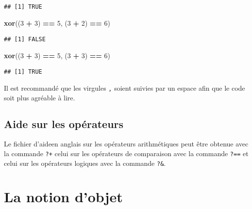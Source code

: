 \documentclass[]{book}
\makeatletter
\newenvironment{Shaded}{\begin{snugshade}}{\end{snugshade}}
\newcommand{\KeywordTok}[1]{\textcolor[rgb]{0.13,0.29,0.53}{\textbf{#1}}}
\newcommand{\DecValTok}[1]{\textcolor[rgb]{0.00,0.00,0.81}{#1}}
\newcommand{\StringTok}[1]{\textcolor[rgb]{0.31,0.60,0.02}{#1}}
\newcommand{\OperatorTok}[1]{\textcolor[rgb]{0.81,0.36,0.00}{\textbf{#1}}}
\newcommand{\NormalTok}[1]{#1}
\newenvironment{kframe}{%
\medskip{}
\setlength{\fboxsep}{.8em}
 \def\at@end@of@kframe{}%
 \ifinner\ifhmode%
  \def\at@end@of@kframe{\end{minipage}}%
  \begin{minipage}{\columnwidth}%
 \fi\fi%
 \def\FrameCommand##1{\hskip\@totalleftmargin \hskip-\fboxsep
 \colorbox{shadecolor}{##1}\hskip-\fboxsep
     \hskip-\linewidth \hskip-\@totalleftmargin \hskip\columnwidth}%
 \MakeFramed {\advance\hsize-\width
   \@totalleftmargin\z@ \linewidth\hsize
   \@setminipage}}%
 {\par\unskip\endMakeFramed%
 \at@end@of@kframe}
\newenvironment{rmdblock}[1]
  {
  \begin{itemize}
  \renewcommand{\labelitemi}{
    \raisebox{-.7\height}[0pt][0pt]{
      {\setkeys{Gin}{width=3em,keepaspectratio}\texttt{[image: myIcons/\#1]}} %
    }
  }
  \setlength{\fboxsep}{1em}
  \begin{kframe}
  \item
  }
  {
  \end{kframe}
  \end{itemize}
  }
\newenvironment{rmdstyle}     %
  {\begin{rmdblock}{style}}   %
  {\end{rmdblock}}            %
\makeatother
\begin{document}
\begin{verbatim}
## [1] TRUE
\end{verbatim}

\begin{Shaded}
\begin{Highlighting}[]
\KeywordTok{xor}\NormalTok{((}\DecValTok{3} \OperatorTok{+}\StringTok{ }\DecValTok{3}\NormalTok{) }\OperatorTok{==}\StringTok{ }\DecValTok{5}\NormalTok{, (}\DecValTok{3} \OperatorTok{+}\StringTok{ }\DecValTok{2}\NormalTok{) }\OperatorTok{==}\StringTok{ }\DecValTok{6}\NormalTok{)}
\end{Highlighting}
\end{Shaded}

\begin{verbatim}
## [1] FALSE
\end{verbatim}

\begin{Shaded}
\begin{Highlighting}[]
\KeywordTok{xor}\NormalTok{((}\DecValTok{3} \OperatorTok{+}\StringTok{ }\DecValTok{3}\NormalTok{) }\OperatorTok{==}\StringTok{ }\DecValTok{5}\NormalTok{, (}\DecValTok{3} \OperatorTok{+}\StringTok{ }\DecValTok{3}\NormalTok{) }\OperatorTok{==}\StringTok{ }\DecValTok{6}\NormalTok{)}
\end{Highlighting}
\end{Shaded}

\begin{verbatim}
## [1] TRUE
\end{verbatim}

\begin{rmdstyle}
Il est recommandé que les virgules \texttt{,} soient suivies par un
espace afin que le code soit plus agréable à lire.
\end{rmdstyle}

\subsection{Aide sur les opérateurs}\label{aide-sur-les-operateurs}

Le fichier d'aideen anglais sur les opérateurs arithmétiques peut être
obtenue avec la commande \texttt{?\textquotesingle{}+\textquotesingle{}}
celui sur les opérateurs de comparaison avec la commande
\texttt{?\textquotesingle{}==\textquotesingle{}} et celui sur les
opérateurs logiques avec la commande
\texttt{?\textquotesingle{}\&\textquotesingle{}}.

\section{La notion d'objet}\label{la-notion-dobjet}
\end{document}
